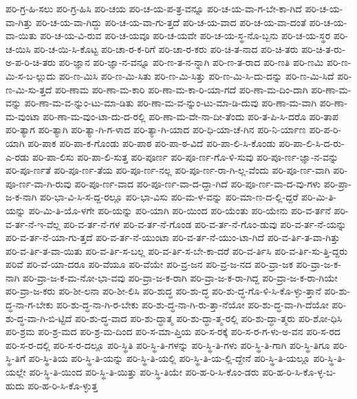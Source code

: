 {ಪರಿ-ಗ್ರ-ಹಿ-ಸಲು
ಪರಿ-ಗ್ರ-ಹಿಸಿ
ಪರಿ-ಚಯ
ಪರಿ-ಚ-ಯ-ಪ-ತ್ರ-ವನ್ನೂ
ಪರಿ-ಚ-ಯ-ವಾ-ಗ-ಬೇ-ಕಾ-ಗಿದೆ
ಪರಿ-ಚ-ಯ-ವಾ-ಗಿತ್ತು
ಪರಿ-ಚ-ಯ-ವಾ-ಗಿದ್ದು
ಪರಿ-ಚ-ಯ-ವಾ-ಗು-ತ್ತದೆ
ಪರಿ-ಚ-ಯ-ವಾದ
ಪರಿ-ಚ-ಯ-ವಾ-ದಂತೆ
ಪರಿ-ಚ-ಯ-ವಾ-ಯಿತು
ಪರಿ-ಚ-ಯ-ವಿ-ರುವ
ಪರಿ-ಚ-ಯವೂ
ಪರಿ-ಚ-ಯವೇ
ಪರಿ-ಚ-ಯ-ಸ್ಥ-ನೊ-ಬ್ಬನು
ಪರಿ-ಚ-ಯ-ಸ್ಥರ
ಪರಿ-ಚ-ಯಿಸಿ
ಪರಿ-ಚ-ಯಿ-ಸಿ-ಕೊಟ್ಟ
ಪರಿ-ಚಾ-ರ-ಕ-ರಿಗೆ
ಪರಿ-ಚಾ-ರ-ಕರು
ಪರಿ-ಚಿ-ತ-ನಾದ
ಪರಿ-ಚಿ-ತರು
ಪರಿ-ಚಿ-ತ-ರು-ಅ-ಪ-ರಿ-ಚಿ-ತರು
ಪರಿ-ಜ್ಞಾನ
ಪರಿ-ಜ್ಞಾ-ನ-ವನ್ನೂ
ಪರಿ-ಣ-ತ-ನ-ನ್ನಾಗಿ
ಪರಿ-ಣ-ತ-ರಾದ
ಪರಿ-ಣತಿ
ಪರಿ-ಣಮಿ
ಪರಿ-ಣ-ಮಿ-ಸ-ಬ-ಲ್ಲುದು
ಪರಿ-ಣ-ಮಿಸಿ
ಪರಿ-ಣ-ಮಿ-ಸಿತು
ಪರಿ-ಣ-ಮಿ-ಸಿತ್ತು
ಪರಿ-ಣ-ಮಿ-ಸಿ-ದು-ದನ್ನು
ಪರಿ-ಣ-ಮಿ-ಸಿದೆ
ಪರಿ-ಣ-ಮಿ-ಸು-ತ್ತದೆ
ಪರಿ-ಣಾಮ
ಪರಿ-ಣಾ-ಮ-ಕಾರಿ
ಪರಿ-ಣಾ-ಮ-ಕಾ-ರಿ-ಯಾ-ಗದೆ
ಪರಿ-ಣಾ-ಮ-ದಿಂ-ದಾಗಿ
ಪರಿ-ಣಾ-ಮ-ವನ್ನು
ಪರಿ-ಣಾ-ಮ-ವ-ನ್ನುಂ-ಟು-ಮಾ-ಡಿತು
ಪರಿ-ಣಾ-ಮ-ವ-ನ್ನುಂ-ಟು-ಮಾ-ಡಿ-ದುವು
ಪರಿ-ಣಾ-ಮ-ವಾಗಿ
ಪರಿ-ಣಾ-ಮ-ವುಂಟಾ
ಪರಿ-ಣಾ-ಮ-ವುಂ-ಟಾ-ದು-ದ-ರಲ್ಲಿ
ಪರಿ-ಣಾ-ಮ-ವೇ-ನಾ-ದೀ-ತೆಂದು
ಪರಿ-ತ-ಪಿ-ಸಿ-ದರೊ
ಪರಿ-ತಾಪ
ಪರಿ-ತ್ಯಾಗ
ಪರಿ-ತ್ಯಾಗಿ
ಪರಿ-ತ್ಯಾ-ಗಿ-ಗ-ಳಾದ
ಪರಿ-ತ್ಯಾ-ಗಿ-ಯಾದ
ಪರಿ-ಧಿ-ಯಾ-ಚೆ-ಗಿನ
ಪರಿ-ನಿ-ರ್ಯಾಣ
ಪರಿ-ಪ-ರಿ-ಯಾಗಿ
ಪರಿ-ಪಾಕ
ಪರಿ-ಪಾ-ಕ-ಗೊಂಡು
ಪರಿ-ಪಾಠ
ಪರಿ-ಪಾ-ಠ-ವಿದೆ
ಪರಿ-ಪಾ-ಲಿ-ಸಿ-ಕೊಂಡು
ಪರಿ-ಪಾ-ಲಿ-ಸಿ-ದ-ರು-ಎ-ರಡು
ಪರಿ-ಪಾ-ಲಿಸು
ಪರಿ-ಪಾ-ಲಿ-ಸುತ್ತ
ಪರಿ-ಪೂರ್ಣ
ಪರಿ-ಪೂ-ರ್ಣ-ಗೊ-ಳಿ-ಸುವು
ಪರಿ-ಪೂ-ರ್ಣ-ಜ್ಞಾ-ನ-ವನ್ನು
ಪರಿ-ಪೂ-ರ್ಣತೆ
ಪರಿ-ಪೂ-ರ್ಣ-ತೆಯ
ಪರಿ-ಪೂ-ರ್ಣ-ನಲ್ಲ
ಪರಿ-ಪೂ-ರ್ಣ-ರಾ-ಗಿ-ಲ್ಲ-ವೆಂದು
ಪರಿ-ಪೂ-ರ್ಣ-ವಾಗಿ
ಪರಿ-ಪೂ-ರ್ಣ-ವಾ-ಗಿ-ರುವು
ಪರಿ-ಪೂ-ರ್ಣ-ವಾದ
ಪರಿ-ಪೂ-ರ್ಣ-ವಾ-ದ-ದ್ದಾ-ಗಿದೆ
ಪರಿ-ಪೂ-ರ್ಣ-ವಾ-ದ-ವು-ಗಳು
ಪರಿ-ಪ್ರಾ-ಜ-ಕ-ನಾಗಿ
ಪರಿ-ಭಾ-ವಿ-ಸಿ-ಸ-ದ್ದ-ರಲ್ಲೂ
ಪರಿ-ಭಾ-ವಿಸು
ಪರಿ-ಮ-ಳ-ವನ್ನು
ಪರಿ-ಮಾ-ಣ-ದ-ಲ್ಲಿ-ದ್ದರೆ
ಪರಿ-ಮಿ-ತಿ-ಯನ್ನು
ಪರಿ-ಮಿ-ತಿ-ಯೊ-ಳಗೇ
ಪರಿ-ಯನ್ನು
ಪರಿ-ಯಾಗಿ
ಪರಿ-ಯಿಂದ
ಪರಿ-ಯೆಂತು
ಪರಿ-ಯೇನು
ಪರಿ-ವ-ರ್ತನೆ
ಪರಿ-ವ-ರ್ತ-ನೆ-ಇ-ವೆಲ್ಲ
ಪರಿ-ವ-ರ್ತ-ನೆ-ಗಳ
ಪರಿ-ವ-ರ್ತ-ನೆ-ಗೊಂಡ
ಪರಿ-ವ-ರ್ತ-ನೆ-ಗೊಂ-ಡುವು
ಪರಿ-ವ-ರ್ತ-ನೆ-ಯನ್ನು
ಪರಿ-ವ-ರ್ತ-ನೆ-ಯಾ-ಗು-ತ್ತದೆ
ಪರಿ-ವ-ರ್ತ-ನೆ-ಯುಂಟಾ
ಪರಿ-ವ-ರ್ತ-ನೆ-ಯುಂ-ಟಾ-ಗಿದೆ
ಪರಿ-ವ-ರ್ತಿ-ತ-ವಾ-ಗಿತ್ತು
ಪರಿ-ವ-ರ್ತಿ-ತ-ವಾ-ಯಿತು
ಪರಿ-ವ-ರ್ತಿ-ಸ-ಬಲ್ಲ
ಪರಿ-ವ-ರ್ತಿ-ಸ-ಬೇ-ಕಾ-ದರೆ
ಪರಿ-ವ-ರ್ತಿಸಿ
ಪರಿ-ವ-ರ್ತಿ-ಸು-ತ್ತಿ-ದ್ದರು
ಪರಿವೆ
ಪರಿ-ವೆ-ಯಾ-ದರೂ
ಪರಿ-ವೆಯೂ
ಪರಿ-ವೆಯೇ
ಪರಿ-ವ್ರ-ಜನ
ಪರಿ-ವ್ರ-ಜ-ನದ
ಪರಿ-ವ್ರಾ-ಜಕ
ಪರಿ-ವ್ರಾ-ಜ-ಕ-ನಾಗಿ
ಪರಿ-ವ್ರಾ-ಜ-ಕ-ಮ-ನೋ-ಭಾ-ವವು
ಪರಿ-ವ್ರಾ-ಜ-ಕ-ರಾಗಿ
ಪರಿ-ವ್ರಾ-ಜ-ಕ-ರಾ-ಗಿದ್ದ
ಪರಿ-ವ್ರಾ-ಜ-ಕ-ರಾ-ಗಿಯೇ
ಪರಿ-ವ್ರಾ-ಜ-ಕರು
ಪರಿ-ಶೀ-ಲನಾ
ಪರಿ-ಶೀ-ಲಿಸಿ
ಪರಿ-ಶುದ್ಧ
ಪರಿ-ಶು-ದ್ಧ
ಪರಿ-ಶು-ದ್ಧ-ಗೊ-ಳಿ-ಸಿ-ಕೊ-ಳ್ಳು-ತ್ತಾನೆ
ಪರಿ-ಶು-ದ್ಧ-ನಾ-ಗ-ಬೇಕು
ಪರಿ-ಶು-ದ್ಧ-ನಾ-ಗಿ-ರ-ಬೇಕು
ಪರಿ-ಶು-ದ್ಧ-ನಾ-ಗಿ-ರು-ತ್ತಾ-ನೆಯೋ
ಪರಿ-ಶು-ದ್ಧ-ವಾ-ಗಿ-ದೆಯೋ
ಪರಿ-ಶು-ದ್ಧ-ವಾ-ಗಿ-ಬಿ-ಟ್ಟಿದೆ
ಪರಿ-ಶು-ದ್ಧ-ವಾದ
ಪರಿ-ಶು-ದ್ಧಾತ್ಮ
ಪರಿ-ಶು-ದ್ಧಾ-ತ್ಮ-ರಲ್ಲಿ
ಪರಿ-ಶು-ದ್ಧಾ-ತ್ಮರು
ಪರಿ-ಶೋ-ಧಿಸಿ
ಪರಿ-ಶ್ರಮ
ಪರಿ-ಶ್ರ-ಮದ
ಪರಿ-ಶ್ರ-ಮ-ದಿಂದ
ಪರಿ-ಸ-ಮಾ-ಪ್ತಿಯ
ಪರಿ-ಸ-ರಕ್ಕೆ
ಪರಿ-ಸ-ರ-ಗ-ಳು-ಅ-ವನ
ಪರಿ-ಸ-ರದ
ಪರಿ-ಸ-ರ-ದಲ್ಲಿ
ಪರಿ-ಸ-ರ-ದಲ್ಲೂ
ಪರಿ-ಸ್ಥಿತಿ
ಪರಿ-ಸ್ಥಿ-ತಿ-ಗಳನ್ನು
ಪರಿ-ಸ್ಥಿ-ತಿ-ಗಳು
ಪರಿ-ಸ್ಥಿ-ತಿ-ಗಾಗಿ
ಪರಿ-ಸ್ಥಿ-ತಿಗೂ
ಪರಿ-ಸ್ಥಿ-ತಿಗೆ
ಪರಿ-ಸ್ಥಿ-ತಿಯ
ಪರಿ-ಸ್ಥಿ-ತಿ-ಯನ್ನು
ಪರಿ-ಸ್ಥಿ-ತಿ-ಯಲ್ಲಿ
ಪರಿ-ಸ್ಥಿ-ತಿ-ಯ-ಲ್ಲಿ-ದ್ದೇನೆ
ಪರಿ-ಸ್ಥಿ-ತಿ-ಯಲ್ಲೂ
ಪರಿ-ಸ್ಥಿ-ತಿ-ಯಲ್ಲೇ
ಪರಿ-ಸ್ಥಿ-ತಿ-ಯಿಂದ
ಪರಿ-ಸ್ಥಿ-ತಿ-ಯಿತ್ತು
ಪರಿ-ಸ್ಥಿ-ತಿಯೇ
ಪರಿ-ಹ-ರಿ-ಸಿ-ಕೊಂ-ಡರು
ಪರಿ-ಹ-ರಿ-ಸಿ-ಕೊ-ಳ್ಳ-ಬ-ಹುದು
ಪರಿ-ಹ-ರಿ-ಸಿ-ಕೊ-ಳ್ಳುತ್ತ
}
